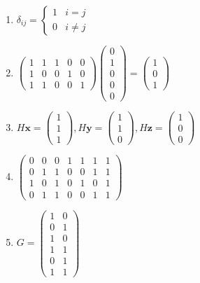 \documentclass[oneside,10pt,]{article}
\begin{document}
\begin{enumerate}
\item{}\(\displaystyle \delta_{ij} = \begin{cases} 1 & i = j \\ 0 & i \neq j \end{cases}\)%
\item{}\(\displaystyle \begin{pmatrix} 1 & 1 & 1 & 0 & 0 \\ 1 & 0 & 0 & 1 & 0 \\ 1 & 1 & 0 & 0 & 1 \end{pmatrix} \begin{pmatrix} 0 \\ 1 \\ 0 \\ 0 \\ 0 \end{pmatrix} = \begin{pmatrix} 1 \\ 0 \\ 1 \end{pmatrix}\)%
\item{}\(\displaystyle H{\mathbf x} = \begin{pmatrix} 1 \\ 1 \\ 1 \end{pmatrix}, H{\mathbf y} = \begin{pmatrix} 1 \\ 1 \\ 0 \end{pmatrix}, H{\mathbf z} = \begin{pmatrix} 1 \\ 0 \\ 0 \end{pmatrix}\)%
\item{}\(\displaystyle \begin{pmatrix} 0 & 0 & 0 & 1 & 1 & 1 & 1 \\ 0 & 1 & 1 & 0 & 0 & 1 & 1 \\ 1 & 0 & 1 & 0 & 1 & 0 & 1 \\ 0 & 1 & 1 & 0 & 0 & 1 & 1 \end{pmatrix}\)%
\item{}\(\displaystyle G = \begin{pmatrix} 1 & 0 \\ 0 & 1 \\ 1 & 0 \\ 1 & 1 \\ 0 & 1 \\ 1 & 1 \end{pmatrix}\)%

\end{enumerate}
\end{document}
